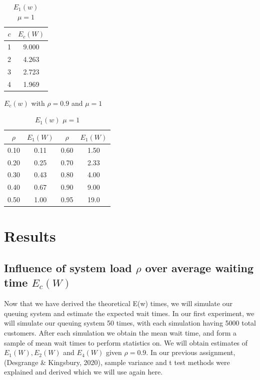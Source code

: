 \documentclass{article}
\begin{document}
    \begin{table}[h!]
        \parbox{.48\linewidth}{
        \centering
        \begin{tabular}{|c | c |}
            \hline
            $c$ & $E_c(W)$ \\
            \hline\hline
            1 & 9.000 \\
            2 & 4.263 \\
            3 & 2.723\\
            4 & 1.969 \\
            \hline
        \end{tabular}
        \caption{$E_c(w)$ with $\rho = 0.9$ and $\mu = 1$}
        \label{Table:ew_by_number_servers_theoretical_results}
        }
        \parbox{.48\linewidth}{
        \centering
        \begin{tabular}{|c | c || c | c |}
            \hline
            $\rho$ & $E_1(W)$ & $\rho$ & $E_1(W)$ \\
            \hline\hline
            0.10 & 0.11 & 0.60 & 1.50\\
            0.20 & 0.25 & 0.70 & 2.33 \\
            0.30 & 0.43 & 0.80 & 4.00 \\
            0.40 & 0.67 & 0.90 & 9.00 \\
            0.50 & 1.00 & 0.95 & 19.0 \\
            \hline
        \end{tabular}
        \caption{$E_1(w)$ $\mu = 1$}
        \label{Table:ew_by_rho_single_server_theoretical_results}
        }
    \end{table}

    \newpage

    \section{Results}
    \subsection*{Influence of system load $\rho$ over average waiting time $E_c(W)$}

    Now that we have derived the theoretical E(w) times, we will simulate our queuing system and estimate the expected wait times. In our first experiment, we will simulate our queuing system 50 times, with each simulation having 5000 total customers. After each simulation we obtain the mean wait time, and form a sample of mean wait times to perform statistics on. We will obtain estimates of $E_1(W), E_2(W)$ and $E_4(W)$ given $\rho = 0.9$. In our previous assignment, (Desgrange \& Kingsbury, 2020), sample variance and t test methods were explained and derived which we will use again here.
\end{document}
